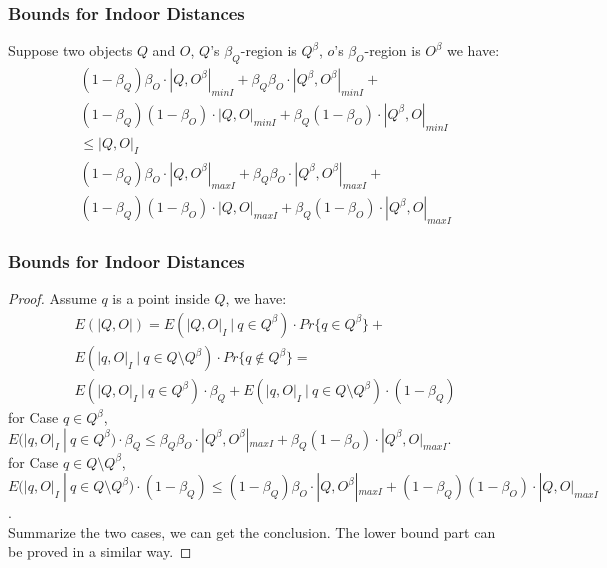 
\begin{frame}
\frametitle{Bounds for Indoor Distances}

\begin{lemma}
  Suppose two objects $Q$ and $O$, $Q$'s $\beta_Q$-region is $Q^\beta$, $o$'s $\beta_O$-region is $O^\beta$ we have:
  \begin{equation*}
    \begin{split}
    & (1 - \beta_Q) \beta_O \cdot |Q, O^\beta|_{minI} + \beta_Q \beta_O \cdot |Q^\beta, O^\beta|_{minI} + \\
    & (1 - \beta_Q) (1 - \beta_O) \cdot |Q, O|_{minI} + \beta_Q (1 - \beta_O) \cdot |Q^\beta, O|_{minI} \\
    & \leq |Q, O|_I  \\
    & (1 - \beta_Q) \beta_O \cdot |Q, O^\beta|_{maxI} + \beta_Q \beta_O \cdot |Q^\beta, O^\beta|_{maxI} + \\
    & (1 - \beta_Q) (1 - \beta_O) \cdot |Q, O|_{maxI} + \beta_Q (1 - \beta_O) \cdot |Q^\beta, O|_{maxI}
    \end{split}
  \end{equation*}
\end{lemma}

\end{frame}


\begin{frame}
\frametitle{Bounds for Indoor Distances}

\begin{proof}{\small}
  Assume $q$ is a point inside $Q$, we have:
  \begin{equation*}
    \begin{split}
      & E(|Q, O|) = E(|Q,O|_I ~|~ q \in Q^\beta) \cdot Pr\{q \in Q^\beta\} + \\
      & E(|q,O|_I ~|~ q \in Q \setminus Q^\beta) \cdot Pr\{q \notin Q^\beta\} = \\
      & E(|Q,O|_I ~|~ q \in Q^\beta) \cdot \beta_Q + E(|q,O|_I ~|~ q \in Q \setminus Q^\beta) \cdot (1 - \beta_Q)
    \end{split}
  \end{equation*}
  for Case $q \in Q^\beta$, $E(|q, O|_I ~|~ q \in Q^\beta) \cdot \beta_Q \leq \beta_Q \beta_O \cdot |Q^\beta, O^\beta|_{maxI} + \beta_Q (1-\beta_O) \cdot |Q^\beta, O|_{maxI}$.\\
  for Case $q \in Q \setminus Q^\beta$, $E(|q, O|_I ~|~ q \in Q \setminus Q^\beta) \cdot (1 - \beta_Q) \leq (1 - \beta_Q) \beta_O \cdot |Q, O^\beta|_{maxI} + (1 - \beta_Q) (1-\beta_O) \cdot |Q, O|_{maxI}$.\\
  Summarize the two cases, we can get the conclusion. The lower bound part can be proved in a similar way.
\end{proof}

\end{frame}

